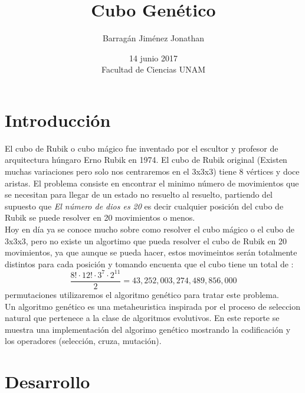 \documentclass[oneside,10pt]{article}
\begin{document}
\author{Barragán Jim\'enez Jonathan}
\date{14 junio 2017\\ Facultad de Ciencias UNAM}
\title{Cubo Gen\'etico }
\maketitle


\section{Introducción}

El cubo de Rubik o cubo m\'agico fue inventado  por el escultor y profesor de arquitectura h\'ungaro Erno Rubik en 1974. El cubo de Rubik original (Existen muchas variaciones pero solo nos centraremos en el 3x3x3) tiene 8 v\'ertices y doce aristas. El problema consiste en encontrar el minimo n\'umero de movimientos que se necesitan para llegar de un estado no resuelto al resuelto, partiendo del supuesto que  \textsl{El n\'umero de dios es 20}\cite{god20}  es decir cualquier posici\'on del cubo de Rubik se puede resolver en 20 movimientos o menos. \\ 

Hoy en d\'ia ya se conoce mucho sobre como resolver el cubo m\'agico o el cubo de 3x3x3, pero no existe un algortimo que pueda resolver el cubo de Rubik en 20 movimientos, ya que aunque se pueda hacer, estos movimeintos ser\'an totalmente distintos para cada posici\'on y tomando encuenta que el cubo tiene un total de :  \[ \frac{8! \cdot 12! \cdot 3^{7} \cdot 2^{11} }{2} = 43,252,003,274,489,856,000 \] permutaciones utilizaremos el algoritmo gen\'etico para tratar este problema.\\

Un algoritmo gen\'etico es una metaheuristica inspirada por el proceso de seleccion natural que pertenece a la clase de algoritmos evolutivos. En este reporte se muestra una implementaci\'on del algorimo gen\'etico mostrando la codificaci\'on y los operadores (selecci\'on, cruza, mutaci\'on). 

\newpage

\section{Desarrollo}
\end{document}
